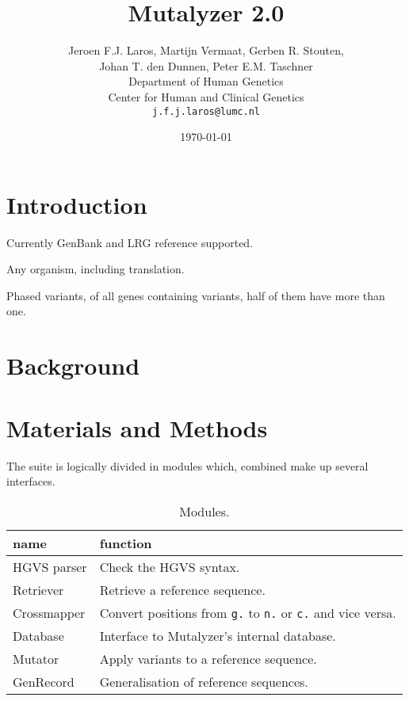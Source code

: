 \documentclass{article}
\title{\Huge Mutalyzer 2.0}
\author{Jeroen F.J. Laros, Martijn Vermaat, Gerben R. Stouten,\\
  Johan T. den Dunnen, Peter E.M. Taschner
  \vspace{10pt}\\
  Department of Human Genetics\\
  Center for Human and Clinical Genetics\\
  \texttt{j.f.j.laros@lumc.nl}}
\date{\today}
\begin{document}
\maketitle

\begin{abstract} \noindent
\end{abstract}

\section{Introduction}\label{introduction}
\cite{Mutalyzer}
\cite{HGVS}

Currently GenBank and LRG reference supported.

Any organism, including translation.

Phased variants, of all genes containing variants, half of them have more than
one.

\section{Background}\label{background}

\section{Materials and Methods}

The suite is logically divided in modules which, combined make up several
interfaces.

\begin{table}[]
  \begin{center}
    \caption{Modules.}
    \begin{tabular}{l|l}
      name           & function\\
      \hline
      HGVS parser    & Check the HGVS syntax.\\
      Retriever      & Retrieve a reference sequence.\\
      Cross\-mapper    & Convert positions from \texttt{g.} to \texttt{n.} or
        \texttt{c.} and vice versa.\\
      Database       & Interface to Mutalyzer's internal database.\\
      Mutator        & Apply variants to a reference sequence.\\
      GenRecord      & Generalisation of reference sequences.\\
    \end{tabular}
  \end{center}
  \label{tab:modules}
\end{table}
\end{document}
